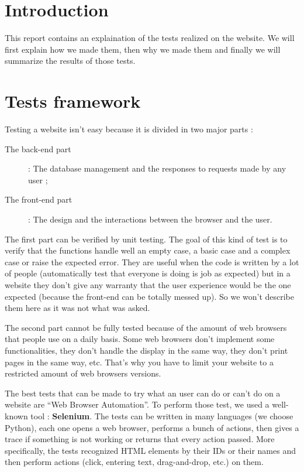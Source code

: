 \section{Introduction}
\label{sec:Introduction}

This report contains an explaination of the tests realized on the website. We
will first explain how we made them, then why we made them and finally we will
summarize the results of those tests.

\section{Tests framework}
\label{sec:Tests framework}

Testing a website isn't easy because it is divided in two major parts :

\begin{description}
    \item[The back-end part] : The database management and the responses to
    requests made by any user ;
    \item[The front-end part] : The design and the interactions between the
    browser and the user.
\end{description}

The first part can be verified by unit testing. The goal of this kind of test
is to verify that the functions handle well an empty case, a basic case and a
complex case or raise the expected error. They are useful when the code is
written by a lot of people (automatically test that everyone is doing is job
as expected) but in a website they don't give any warranty that the user
experience would be the one expected (because the front-end can be totally
messed up). So we won't describe them here as it was not what was asked. \newline

The second part cannot be fully tested because of the amount of web browsers
that people use on a daily basis. Some web browsers don't implement some
functionalities, they don't handle the display in the same way, they don't
print pages in the same way, etc. That's why you have to limit your website to
a restricted amount of web browsers versions. \newline

The best tests that can be made to try what an user can do or can't do on a
website are \enquote{Web Browser Automation}. To perform those test,
we used a well-known tool : \textbf{Selenium}. The tests can be written in
many languages (we choose Python), each one opens a web browser, performs a
bunch of actions, then gives a trace if something is not working or returns
that every action passed. More specifically, the tests recognized HTML elements
by their IDs or their names and then perform actions (click, entering text,
drag-and-drop, etc.) on them. \newline

